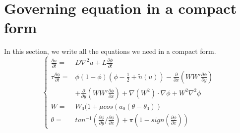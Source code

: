 \documentclass{article}
\begin{document}
    \section{Governing equation in a compact form}
        In this section, we write all the equations we need in a compact form.
        \begin{equation}
            \begin{cases}
                 \frac{\partial u}{\partial t} =&D\nabla^2u+L\frac{\partial\phi}{\partial t} \\
                 \tau\frac{\partial \phi}{\partial t} =&  \phi(1-\phi)(\phi-\frac{1}{2}+\tilde{n}(u)) - \frac{\partial}{\partial x}(WW'\frac{\partial\phi}{\partial y})\\
                 &  + \frac{\partial}{\partial y}(WW'\frac{\partial\phi}{\partial x}) + \nabla(W^2)\cdot\nabla\phi + W^2\nabla^2\phi \\
                 W = & W_0(1+\mu cos(a_0(\theta-\theta_0)) \\
                 \theta = & tan^{-1}(\frac{\partial\phi}{\partial y}/\frac{\partial\phi}{\partial x}) + \pi(1-sign(\frac{\partial\phi}{\partial x})) 
            \end{cases}
        \end{equation}
\end{document}
